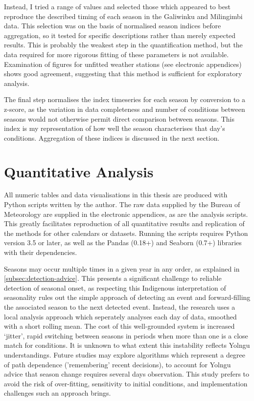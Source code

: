 Instead, I tried a range of values and selected those which appeared to
best reproduce the described timing of each season in the Galiwinku and
Milingimbi data.  This selection was on the basis of normalised season
indices before aggregation, so it tested for specific descriptions
rather than merely expected results.
%
This is probably the weakest step in the quantification method, but the data
required for more rigorous fitting of these parameters is not available.
Examination of figures for unfitted weather stations (see electronic appendices)
shows good agreement, suggesting that this method is sufficient for exploratory
analysis.

The final step normalises the index timeseries for each season by conversion to
a z-score, as the variation in data completeness and number of conditions between
seasons would not otherwise permit direct comparison between seasons.
This index is my representation of how well the season characterises that day's
conditions.  Aggregation of these indices is discussed in the next section.



\section{Quantitative Analysis}

All numeric tables and data visualisations in this thesis are produced
with Python scripts written by the author.  The raw data supplied by the
Bureau of Meteorology are supplied in the electronic appendices, as
are the analysis scripts.  This greatly facilitates reproduction of all
quantitative results and replication of the methods for other calendars
or datasets.  Running the scripts requires Python version 3.5 or later,
as well as the Pandas (0.18+) and Seaborn (0.7+) libraries with their
dependencies.

Seasons may occur multiple times in a given year in any order, as explained
in \cref{subsec:detection-advice}.  This presents a significant
challenge to reliable detection of seasonal onset, as respecting this
Indigenous interpretation of seasonality rules out
the simple approach of detecting an event and forward-filling the
associated season to the next detected event.  Instead, the research
uses a local analysis approach which seperately analyses each day of data,
smoothed with a short rolling mean.
%
The cost of this well-grounded system is increased `jitter', rapid
switching between seasons in periods when more than one is a close match
for conditions.  It is unknown to what extent this instability reflects Yolngu understandings.
%
Future studies may explore algorithms which represent a degree of path
dependence ('remembering' recent decisions), to account for Yolngu advice
that season change requires
several days observation.  This study prefers to avoid the risk of
over-fitting, sensitivity to initial conditions, and implementation
challenges such an approach brings.

